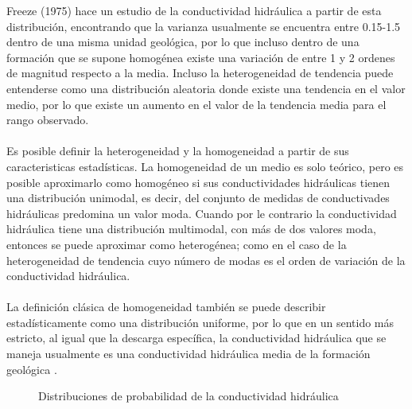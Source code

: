 Freeze (1975) hace un estudio de la conductividad hidráulica a partir de esta distribución, encontrando que la varianza usualmente se encuentra entre 0.15-1.5 dentro de una misma unidad geológica, por lo que incluso dentro de una formación que se supone homogénea existe una variación de entre 1 y 2 ordenes de magnitud respecto a la media. Incluso la heterogeneidad de tendencia puede entenderse como una distribución aleatoria donde existe una tendencia en el valor medio, por lo que existe un aumento en el valor de la tendencia media para el rango observado.
\\
\\
Es posible definir la heterogeneidad y la homogeneidad a partir de sus caracteristicas estadísticas. La homogeneidad de un medio es solo teórico, pero es posible aproximarlo como homogéneo si sus conductividades hidráulicas tienen una distribución unimodal, es decir, del conjunto de medidas de conductivades hidráulicas predomina un valor moda. Cuando por le contrario la conductividad hidráulica tiene una distribución multimodal, con más de dos valores moda, entonces se puede aproximar como heterogénea; como en el caso de la heterogeneidad de tendencia cuyo número de modas es el orden de variación de la conductividad hidráulica.
\\
\\
La definición clásica de homogeneidad también se puede describir estadísticamente como una distribución uniforme, por lo que en un sentido más estricto, al igual que la descarga específica, la conductividad hidráulica que se maneja usualmente es una conductividad hidráulica media de la formación geológica \cite{Freeze1979}.


\begin{figure}[htbp]
\centering
{}
\caption{Distribuciones de probabilidad de la conductividad hidráulica} \label{fig:lego}
\end{figure} 

